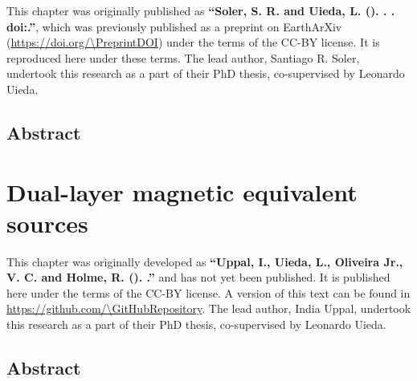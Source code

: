 \documentclass[10pt,a4paper,oneside]{book}
\begin{document}
\begingroup


\begin{summarybox}
    \noindent
    This chapter was originally published as
    \textbf{``Soler, S. R. and Uieda, L. (\Year). \Title{}. \textit{\Journal{}}.
    doi:\href{https://doi.org/\DOI}{\DOI}.''}, which was previously published
    as a preprint on EarthArXiv (\url{https://doi.org/\PreprintDOI}) under the
    terms of the CC-BY license. It is reproduced here under these terms.
    The lead author, Santiago R. Soler, undertook this research as a part of
    their PhD thesis, co-supervised by Leonardo Uieda.
\end{summarybox}

\section*{Abstract}




\endgroup

\chapter{Dual-layer magnetic equivalent sources}
\label{chap_eqsdual}

\begingroup


\begin{summarybox}
    \noindent
    This chapter was originally developed as
    \textbf{``Uppal, I., Uieda, L., Oliveira Jr., V. C. and Holme, R. (\Year).
    \Title{}.''} and has not yet been published.
    It is published here under the terms of the CC-BY license.
    A version of this text can be found in
    \url{https://github.com/\GitHubRepository}.
    The lead author, India Uppal, undertook this research as a part of
    their PhD thesis, co-supervised by Leonardo Uieda.
\end{summarybox}

\section*{Abstract}



\endgroup

\end{document}
